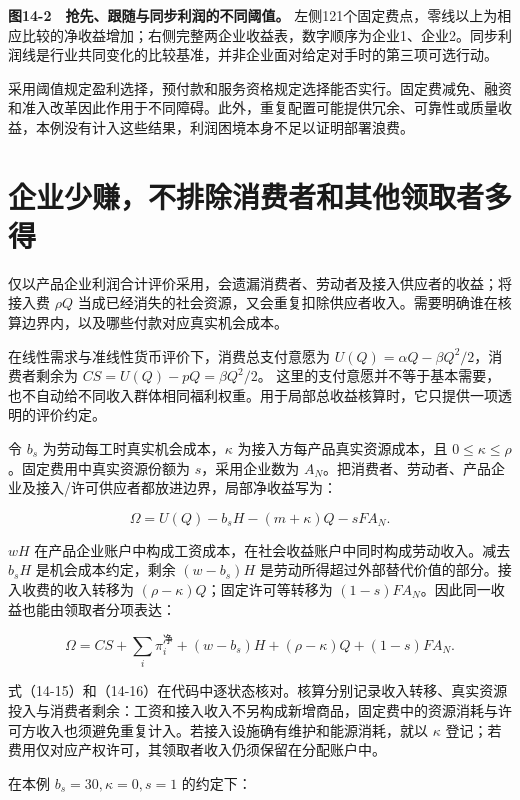 \documentclass[UTF8,fontset=windows,12pt,a4paper,oneside,openany]{ctexbook}
\begin{document}
\textbf{图14-2　抢先、跟随与同步利润的不同阈值。} 左侧121个固定费点，零线以上为相应比较的净收益增加；右侧完整两企业收益表，数字顺序为企业1、企业2。同步利润线是行业共同变化的比较基准，并非企业面对给定对手时的第三项可选行动。

采用阈值规定盈利选择，预付款和服务资格规定选择能否实行。固定费减免、融资和准入改革因此作用于不同障碍。此外，重复配置可能提供冗余、可靠性或质量收益，本例没有计入这些结果，利润困境本身不足以证明部署浪费。

\section{企业少赚，不排除消费者和其他领取者多得}

仅以产品企业利润合计评价采用，会遗漏消费者、劳动者及接入供应者的收益；将接入费 \(\rho Q\) 当成已经消失的社会资源，又会重复扣除供应者收入。需要明确谁在核算边界内，以及哪些付款对应真实机会成本。

在线性需求与准线性货币评价下，消费总支付意愿为
\(U(Q)=\alpha Q-\beta Q^2/2\)，消费者剩余为
\(CS=U(Q)-pQ=\beta Q^2/2\)。
这里的支付意愿并不等于基本需要，也不自动给不同收入群体相同福利权重。用于局部总收益核算时，它只提供一项透明的评价约定。

令 \(b_s\) 为劳动每工时真实机会成本，\(\kappa\) 为接入方每产品真实资源成本，且 \(0\leq\kappa\leq\rho\)。固定费用中真实资源份额为 \(s\)，采用企业数为 \(A_N\)。把消费者、劳动者、产品企业及接入/许可供应者都放进边界，局部净收益写为：

\[
\Omega=U(Q)-b_sH-(m+\kappa)Q-sFA_N.
\tag{14-15}
\]

\(wH\) 在产品企业账户中构成工资成本，在社会收益账户中同时构成劳动收入。减去 \(b_sH\) 是机会成本约定，剩余 \((w-b_s)H\) 是劳动所得超过外部替代价值的部分。接入收费的收入转移为 \((\rho-\kappa)Q\)；固定许可等转移为 \((1-s)FA_N\)。因此同一收益也能由领取者分项表达：

\[
\Omega=CS+\sum_i\pi_i^{\text{净}}
+(w-b_s)H+(\rho-\kappa)Q+(1-s)FA_N.
\tag{14-16}
\]

式（14-15）和（14-16）在代码中逐状态核对。核算分别记录收入转移、真实资源投入与消费者剩余：工资和接入收入不另构成新增商品，固定费中的资源消耗与许可方收入也须避免重复计入。若接入设施确有维护和能源消耗，就以 \(\kappa\) 登记；若费用仅对应产权许可，其领取者收入仍须保留在分配账户中。

在本例 \(b_s=30,\kappa=0,s=1\) 的约定下：
\end{document}
